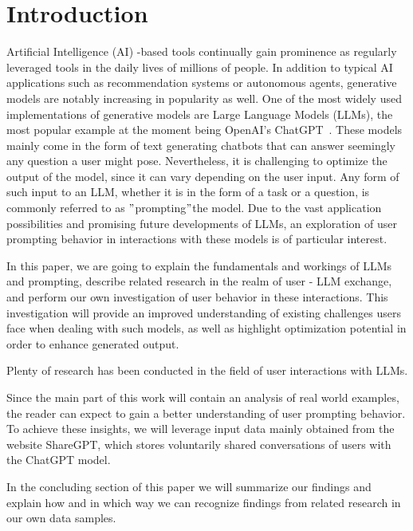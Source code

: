 
\section{Introduction}
\label{sec:introduction}

\sloppy %
Artificial Intelligence (AI) -based tools continually gain prominence as regularly leveraged tools in the
daily lives of millions of people.
In addition to typical AI applications such as recommendation systems or autonomous agents, generative
models are notably increasing in popularity as well.
One of the most widely used implementations of generative models are Large Language Models (LLMs),
the most popular example at the moment being OpenAI's ChatGPT~\cite{openai_chatgpt_2023}.
These models mainly come in the form of text generating chatbots that can answer seemingly any question
a user might pose.
Nevertheless, it is challenging to optimize the output of the model, since it can vary depending
on the user input. %
Any form of such input to an LLM, whether it is in the form of a task or a question, is commonly
referred to as \("\)prompting\("\)the model.
Due to the vast application possibilities and promising future developments of LLMs,
an exploration of user prompting behavior in interactions with these models is of particular interest.

In this paper, we are going to explain the fundamentals and workings of LLMs and prompting,
describe related research in the realm of user - LLM exchange, and perform our own investigation of
user behavior in these interactions.
This investigation will provide an improved understanding of existing challenges users face when
dealing with such models, as well as highlight optimization potential in order to enhance generated
output.

Plenty of research has been conducted in the field of user interactions with LLMs.

Since the main part of this work will contain an analysis of real world examples, the reader can
expect to gain a better understanding of user prompting behavior.
To achieve these insights, we will leverage input data mainly obtained from the website
ShareGPT, %
which stores voluntarily shared conversations of users with the ChatGPT model. %

In the concluding section of this paper we will summarize our findings and explain how and in which way
we can recognize findings from related research in our own data samples.
